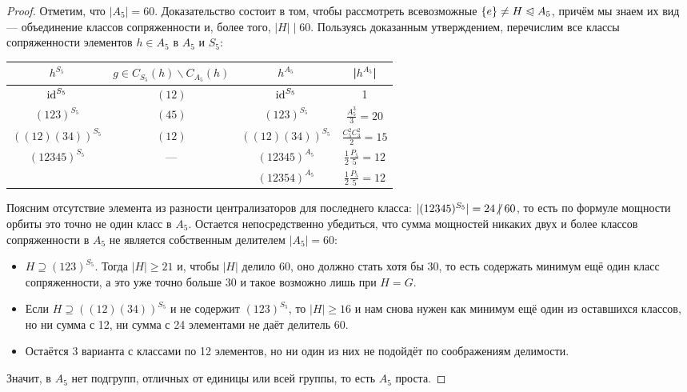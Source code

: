 \begin{proof}
	Отметим, что $|A_5| = 60$. Доказательство состоит в том, чтобы рассмотреть всевозможные $\{e\} \neq H \trianglelefteqslant A_5$, причём мы знаем их вид --- объединение классов сопряженности и, более того, $|H| \mid 60$. Пользуясь доказанным утверждением, перечислим все классы сопряженности элементов $h \in A_5$ в $A_5$ и $S_5$:
	\def\arraystretch{1.5}
	\begin{center}
		\begin{tabular}{c|c|c|c}
			$h^{S_5}$ & $g \in C_{S_5}(h) \backslash C_{A_5}(h)$ & $h^{A_5}$ & |$h^{A_5}$| \\
			\hline
			$\operatorname{id}^{S_5}$ & $(12)$ & $\operatorname{id}^{S_5}$ & 1\\
			\hline
			$(123)^{S_5}$ & $(45)$ & $(123)^{S_5}$ & $\frac{A_5^3}3 = 20$\\
			\hline
			$((12)(34))^{S_5}$ & $(12)$ & $((12)(34))^{S_5}$ & $\frac{C_5^2C_3^2}2 = 15$ \\
			\hline
			\multirow{2}{*}{$(12345)^{S_5}$}& \multirow{2}{*}{---} & $(12345)^{A_5}$ & $\frac12\frac{P_5}{5} = 12$ \\
			\cline{3-4}
			&  & $(12354)^{A_5}$ & $\frac12\frac{P_5}{5} = 12$ \\
		\end{tabular}
	\end{center}
	\def\arraystretch{1}
	
	Поясним отсутствие элемента из разности централизаторов для последнего класса: $|(12345)^{S_5}| = 24 \centernot\mid 60$, то есть по формуле мощности орбиты это точно не один класс в $A_5$. Остается непосредственно убедиться, что сумма мощностей никаких двух и более классов сопряженности в $A_5$ не является собственным делителем $|A_5| = 60$:
	\begin{itemize}
		\item $H \supseteq (123)^{S_5}$. Тогда $|H| \ge 21$ и, чтобы $|H|$ делило $60$, оно должно стать хотя бы $30$, то есть содержать минимум ещё один класс сопряженности, а это уже точно больше $30$ и такое возможно лишь при $H = G$.
		
		\item Если $H \supseteq ((12)(34))^{S_5}$ и не содержит $(123)^{S_5}$, то $|H| \ge 16$ и нам снова нужен как минимум ещё один из оставшихся классов, но ни сумма с 12, ни сумма с 24 элементами не даёт делитель 60.
		
		\item Остаётся 3 варианта с классами по 12 элементов, но ни один из них не подойдёт по соображениям делимости.
	\end{itemize}
	Значит, в $A_5$ нет подгрупп, отличных от единицы или всей группы, то есть $A_5$ проста.
\end{proof}

